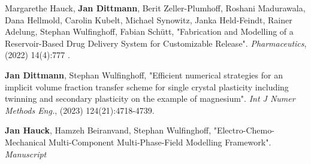 \vspace{1 cm}
\begin{enumerate}[label={[\arabic*]}]
\item Margarethe Hauck, \textbf{Jan Dittmann}, Berit Zeller-Plumhoff, Roshani Madurawala, Dana Hellmold, Carolin Kubelt, Michael Synowitz, Janka Held-Feindt, Rainer Adelung, Stephan Wulfinghoff, Fabian Schütt, "Fabrication and Modelling of a Reservoir-Based Drug Delivery System for Customizable Release". \textit{Pharmaceutics}, (2022) 14(4):777 . 
\item \textbf{Jan Dittmann}, Stephan Wulfinghoff, "Efficient numerical strategies for an implicit volume fraction transfer scheme for single crystal plasticity including twinning and secondary plasticity on the example of magnesium". \textit{Int J Numer Methods Eng.}, (2023) 124(21):4718-4739.
\item \textbf{Jan Hauck}, Hamzeh Beiranvand, Stephan Wulfinghoff, "Electro-Chemo-Mechanical Multi-Component Multi-Phase-Field Modelling Framework". \textit{Manuscript}
\end{enumerate}